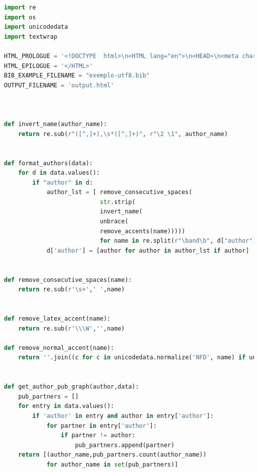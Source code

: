 \documentclass[11pt,a4paper]{report}
\begin{document}
\begin{lstlisting}[language=python]
import re
import os
import unicodedata
import textwrap

HTML_PROLOGUE = '<!DOCTYPE  html>\n<HTML lang="en">\n<HEAD>\n<meta charset="utf-8">\n      <TITLE>Categories in BibTeX</TITLE>\n <script type="text/x-mathjax-config"> MathJax.Hub.Config({"extensions":["tex2jax.js"],"jax":["input/TeX","output/HTML-CSS"],"messageStyle":"none","tex2jax":{"processEnvironments":false,"processEscapes":true,"inlineMath":[["$","$"],["\\(","\\)"]],"displayMath":[["$$","$$"],["\\[","\\]"]]},"TeX":{"extensions":["AMSmath.js","AMSsymbols.js","noErrors.js","noUndefined.js"]},"HTML-CSS":{"availableFonts":["TeX"]}}); </script> <script type="text/javascript" async src="file:////home/useralef/.vscode/extensions/shd101wyy.markdown-preview-enhanced-0.6.1/node_modules/@shd101wyy/mume/dependencies/mathjax/MathJax.js" charset="UTF-8"></script>  </HEAD>\n'
HTML_EPILOGUE = '</HTML>'
BIB_EXAMPLE_FILENAME = "exemplo-utf8.bib"
OUTPUT_FILENAME = 'output.html'



def invert_name(author_name):
    return re.sub(r"([^,]+),\s*([^,]+)", r"\2 \1", author_name)


def format_authors(data):
    for d in data.values():
        if "author" in d:
            author_lst = [ remove_consecutive_spaces(
                           str.strip(
                           invert_name(
                           unbrace(
                           remove_accents(name)))))
                           for name in re.split(r"\band\b", d["author"].replace("\n", " "))]
            d['author'] = [author for author in author_lst if author]


def remove_consecutive_spaces(name):
    return re.sub(r'\s+',' ',name)


def remove_latex_accent(name):
    return re.sub(r'\\\W','',name)

def remove_normal_accent(name):
    return ''.join((c for c in unicodedata.normalize('NFD', name) if unicodedata.category(c) != 'Mn'))


def get_author_pub_graph(author,data):
    pub_partners = []
    for entry in data.values():
        if 'author' in entry and author in entry['author']:
            for partner in entry['author']:
                if partner != author:
                    pub_partners.append(partner)
    return [(author_name,pub_partners.count(author_name))
            for author_name in set(pub_partners)]



\end{lstlisting}
\end{document}
